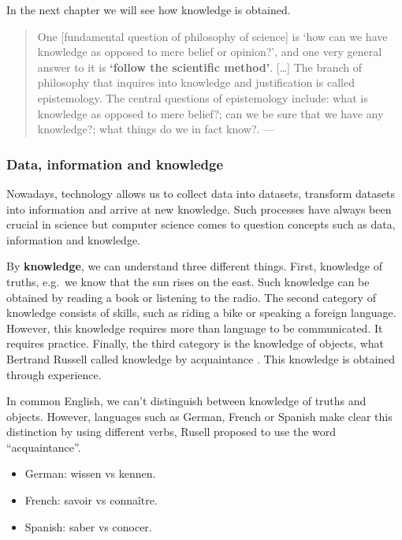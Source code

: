 \documentclass[
  12pt,
]{book}
\providecommand{\tightlist}{%
  \setlength{\itemsep}{0pt}\setlength{\parskip}{0pt}}
\begin{document}
In the next chapter we will see how knowledge is obtained.

\begin{quote}
One {[}fundamental question of philosophy of science{]} is `how can we have knowledge as opposed to mere belief or opinion?', and one very general answer to it is \textbf{`follow the scientific method'}. {[}\ldots{]} The branch of philosophy that inquires into knowledge and justification is called epistemology. The central questions of epistemology include: what is knowledge as opposed to mere belief?; can we be sure that we have any knowledge?; what things do we in fact know?. --- \citep{ladyman2012understanding}
\end{quote}

\subsubsection{Data, information and knowledge}\label{data-information-and-knowledge}

Nowadays, technology allows us to collect data into datasets, transform datasets into information and arrive at new knowledge. Such processes have always been crucial in science but computer science comes to question concepts such as data, information and knowledge. \citep{johansson2016philosophy}

By \textbf{knowledge}, we can understand three different things. First, knowledge of truths, e.g.~we know that the sun rises on the east. Such knowledge can be obtained by reading a book or listening to the radio.
The second category of knowledge consists of skills, such as riding a bike or speaking a foreign language. However, this knowledge requires more than language to be communicated. It requires practice.
Finally, the third category is the knowledge of objects, what Bertrand Russell called knowledge by acquaintance \citep{russell2001problems}. This knowledge is obtained through experience.

In common English, we can't distinguish between knowledge of truths and objects. However, languages such as German, French or Spanish make clear this distinction by using different verbs, Rusell proposed to use the word ``acquaintance''.

\begin{itemize}
\tightlist
\item
  German: wissen vs kennen.
\item
  French: savoir vs connaître.
\item
  Spanish: saber vs conocer.
\end{itemize}
\end{document}
